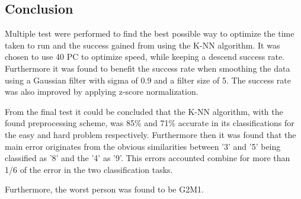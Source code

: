 \subsection{Conclusion}



Multiple test were performed to find the best possible way to optimize the time taken to run and the success gained from using the K-NN algorithm.
It was chosen to use 40 PC to optimize speed, while keeping a descend success rate.
Furthermore it was found to benefit the success rate when smoothing the data using a Gaussian filter with sigma of 0.9 and a filter size of 5.
The success rate was also improved by applying z-score normalization.

From the final test it could be concluded that the K-NN algorithm, with the found preprocessing scheme, was 85\% and 71\% accurate in its classifications for the easy and hard problem respectively.
Furthermore then it was found that the main error originates from the obvious similarities between '3' and '5' being classified as '8' and the '4' as '9'.
This errors accounted combine for more than 1/6 of the error in the two classification tasks.

Furthermore, the worst person was found to be G2M1.
